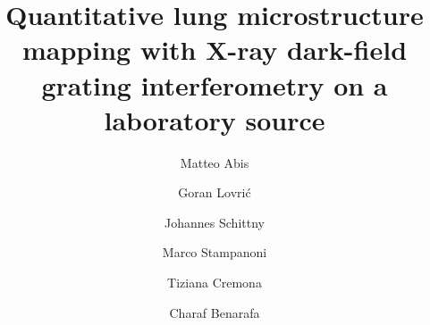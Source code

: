 \documentclass[preprint,12pt]{elsarticle}
\begin{document}
\begin{frontmatter}



\title{Quantitative lung microstructure mapping with X-ray dark-field grating
interferometry on a laboratory source}



\author[add1,add2]{Matteo Abis}%
\author[add2]{Goran Lovrić}%
\author[add3]{Johannes Schittny}%
\author[add1,add2]{Marco Stampanoni}%
\author[add4]{Tiziana Cremona}%
\author[add3]{Charaf Benarafa}%
\address[add1]{ETH Zurich}%
\address[add2]{Paul Scherrer Institute}%
\address[add3]{University of Bern}%
\address[add4]{Harvard School of Public Health}%


\end{frontmatter}
\end{document}
